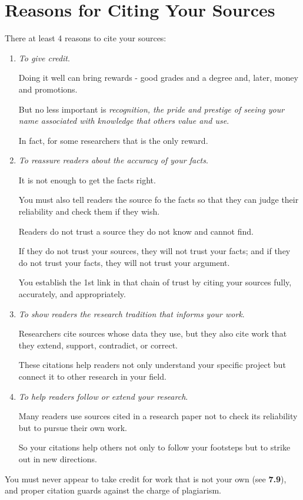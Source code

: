 \documentclass[oneside]{book}
\numberwithin{equation}{section}
\begin{document}
\section{Reasons for Citing Your Sources}
There at least 4 reasons to cite your sources:
\begin{enumerate}
    \item \textit{To give credit}.
    
    
    Doing it well can bring rewards - good grades and a degree and, later, money and promotions.
    
    But no less important is \textit{recognition, the pride and prestige of seeing your name associated with knowledge that others value and use}.
    
    In fact, for some researchers that is the only reward.
    
    \item \textit{To reassure readers about the accuracy of your facts}.
    
    
    It is not enough to get the facts right.
    
    You must also tell readers the source fo the facts so that they can judge their reliability and check them if they wish.
    
    Readers do not trust a source they do not know and cannot find.
    
    If they do not trust your sources, they will not trust your facts; and if they do not trust your facts, they will not trust your argument.
    
    You establish the 1st link in that chain of trust by citing your sources fully, accurately, and appropriately.
    \item \textit{To show readers the research tradition that informs your work}.
    
    Researchers cite sources whose data they use, but they also cite work that they extend, support, contradict, or correct.
    
    These citations help readers not only understand your specific project but connect it to other research in your field.
    \item \textit{To help readers follow or extend your research}.
    
    Many readers use sources cited in a research paper not to check its reliability but to pursue their own work.
    
    So your citations help others not only to follow your footsteps but to strike out in new directions.
\end{enumerate}
You must never appear to take credit for work that is not your own (see \textbf{7.9}), and proper citation guards against the charge of plagiarism.
\end{document}
